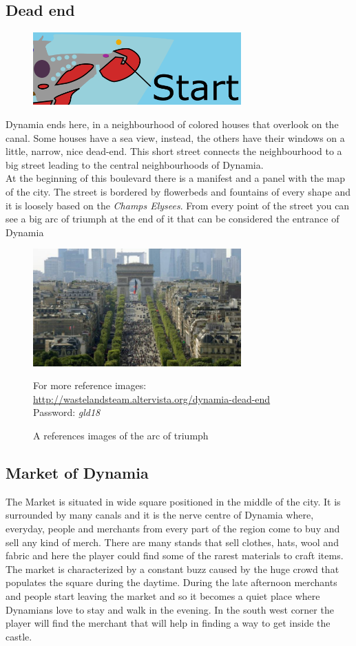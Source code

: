 \subsection{Dead end}
\begin{figure}[H]
    \centering
    \includegraphics[width=8cm]{Images/Maps/deadEnd}
  \end{figure}
Dynamia ends here, in a neighbourhood of colored houses that overlook on the canal. Some houses have a sea view, instead, the others have their windows on a little, narrow, nice dead-end.
This short street connects the neighbourhood to a big street leading to the central neighbourhoods of Dynamia. \\
At the beginning of this boulevard there is a manifest and a panel with the map of the city. 
The street is bordered by flowerbeds and fountains of every shape and it is loosely based on the \textit{Champs Elysees}.
From every point of the street you can see a big arc of triumph at the end of it that can be considered the entrance of Dynamia
\begin{figure}[H]
    \centering
    \includegraphics[width=8cm]{Images/Landmarks/arcOfTriumph}
    \caption{A references images of the arc of triumph}
    For more reference images: \href{http://wastelandsteam.altervista.org/dynamia-dead-end}{http://wastelandsteam.altervista.org/dynamia-dead-end}\\Password: \textit{gld18}
  \end{figure}

\subsection{Market of Dynamia}
The Market is situated in wide square positioned in the middle of the city. It is surrounded by many canals and it is the nerve centre of Dynamia where, everyday, people and merchants from every part of the region come to buy and sell any kind of merch. There are many stands that sell clothes, hats, wool and fabric and here the player could find some of the rarest materials to craft items. \\
The market is characterized by a constant buzz caused by the huge crowd that populates  the square during the daytime. During the late afternoon merchants and people start leaving the market and so it becomes a quiet place where Dynamians love to stay and walk in the evening.
In the south west corner the player will find the merchant that will help in finding a way to get inside the castle.
 
